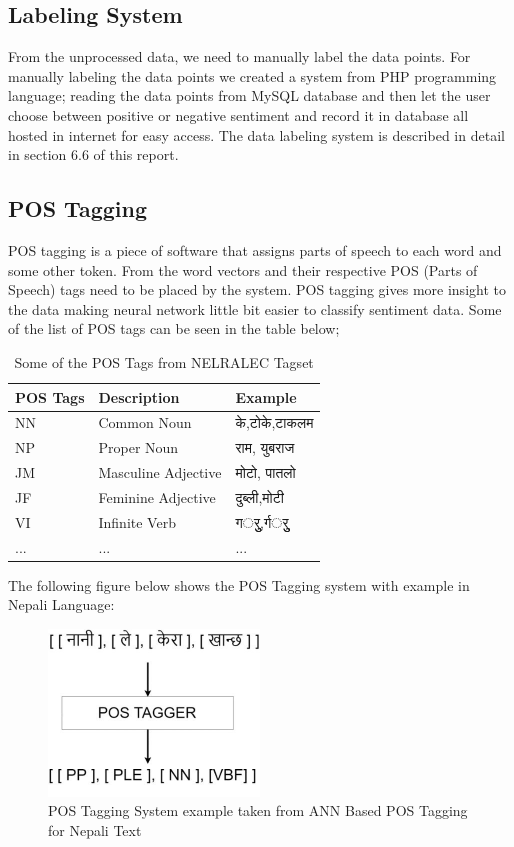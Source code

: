             \subsection{Labeling System}
From the unprocessed data, we need to manually label the data points. For manually
labeling the data points we created a system from PHP programming language; reading
the data points from MySQL database and then let the user choose between positive or
negative sentiment and record it in database all hosted in internet for easy access. The
data labeling system is described in detail in section 6.6 of this report.
            \subsection{POS Tagging}
POS tagging is a piece of software that assigns parts of speech to each word and some
other token. From the word vectors and their respective POS (Parts of Speech) tags
need to be placed by the system. POS tagging gives more insight to the data making
neural network little bit easier to classify sentiment data. Some of the list of POS tags
can be seen in the table below;
    \begin{table}[hbt!]
        \centering
        \caption{Some of the POS Tags from NELRALEC Tagset}
       \begin{tabular}{|p{3cm}|p{5cm}|p{3cm}|}
            \hline
            \textbf{POS Tags} & \textbf{Description} & \textbf{Example} \\
            \hline
            NN & Common Noun &  के,टोके,टाकलम \\
            \hline
            NP & Proper Noun & राम, युबराज  \\
            \hline
            JM & Masculine Adjective & मोटो, पातलो \\
            \hline
            JF & Feminine Adjective  & दुब्ली,मोटी  \\
            \hline
             VI & Infinite Verb & गर्ुु,र्गर्ुु \\
            \hline
              ... & ... & ... \\
            \hline
        \end{tabular}
    \end{table}

The following figure below shows the POS Tagging system with example in Nepali
Language:
        \begin{figure}[hbt!]
            \centering
                \includegraphics[width=0.5\textwidth]{./img/6.8.jpg}
                \caption{POS Tagging System example taken from ANN Based POS Tagging for Nepali Text}
        \end{figure}
